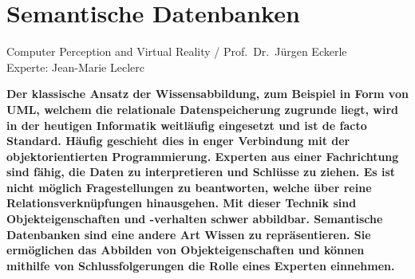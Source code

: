 \documentclass[
    paper=a4,               %
    fontsize=10pt,          %
    open=right,             %
    titlepage=false,        %
    parskip=half,           %
]{scrreprt}                 %
\begin{document}
    \chapter*{Semantische Datenbanken}

    Computer Perception and Virtual Reality / Prof.\ Dr.\ Jürgen Eckerle\\
    Experte: Jean-Marie Leclerc

    \textbf{Der klassische Ansatz der Wissensabbildung, zum Beispiel in Form von UML, welchem die relationale Datenspeicherung zugrunde liegt, wird in der heutigen Informatik weitläufig eingesetzt und ist de facto Standard. Häufig geschieht dies in enger Verbindung mit der objektorientierten Programmierung. Experten aus einer Fachrichtung sind fähig, die Daten zu interpretieren und Schlüsse zu ziehen. Es ist nicht möglich Fragestellungen zu beantworten, welche über reine Relationsverknüpfungen hinausgehen. Mit dieser Technik sind Objekteigenschaften und -verhalten schwer abbildbar. Semantische Datenbanken sind eine andere Art Wissen zu repräsentieren. Sie ermöglichen das Abbilden von Objekteigenschaften und können mithilfe von Schlussfolgerungen die Rolle eines Experten einnehmen.}
\end{document}
